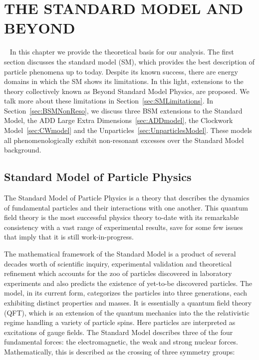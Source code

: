 \chapter{THE STANDARD MODEL AND BEYOND}~\label{ch:theory}
In this chapter we provide the theoretical basis for our analysis. The first section discusses the standard model (SM), which provides the best description of particle phenomena up to today. Despite its known success, there are energy domains in which the SM shows its limitations. In this light, extensions to the theory collectively known as Beyond Standard Model Physics, are proposed. We talk more about these limitations in Section~\ref{sec:SMLimitations}. In Section~\ref{sec:BSMNonReso}, we discuss three BSM extensions to the Standard Model, the ADD Large Extra Dimensions~\ref{sec:ADDmodel}, the Clockwork Model~\ref{sec:CWmodel} and the Unparticles~\ref{sec:UnparticlesModel}. These models all phenomenologically exhibit non-resonant excesses over the Standard Model background. 

\section{Standard Model of Particle Physics}
The Standard Model of Particle Physics is a theory that describes the dynamics of fundamental particles and their interactions with one another. This quantum field theory is the most successful physics theory to-date with its remarkable consistency with a vast range of experimental results, save for some few issues that imply that it is still work-in-progress.

The mathematical framework of the Standard Model is a product of several decades worth of scientific inquiry, experimental validation and theoretical refinement which accounts for the zoo of particles discovered in laboratory experiments and also predicts the existence of yet-to-be discovered particles. The model, in its current form, categorizes the particles into three generations, each exhibiting distinct properties and masses. It is essentially a quantum field theory (QFT), which is an extension of the quantum mechanics into the the relativistic regime handling a variety of particle spins. Here particles are interpreted as excitations of gauge fields. The Standard Model describes three of the four fundamental forces: the electromagnetic, the weak and strong nuclear forces. Mathematically, this is described as the crossing of three symmetry groups:

